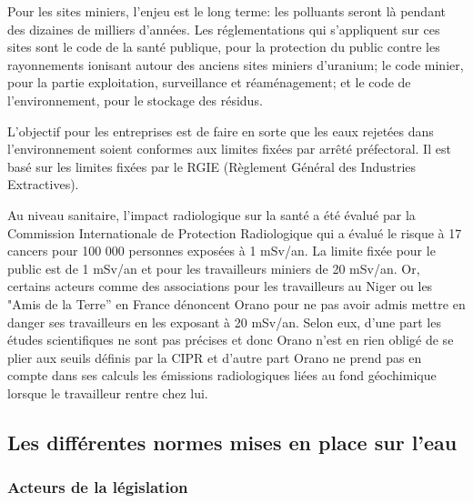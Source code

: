 \documentclass{article}
\begin{document}
Pour les sites miniers, l’enjeu est le long terme: les polluants seront là pendant des dizaines de milliers d’années. Les réglementations qui s’appliquent sur ces sites sont le code de la santé publique, pour la protection du public contre les rayonnements ionisant autour des anciens sites miniers d’uranium; le code minier, pour la partie exploitation, surveillance et réaménagement; et le code de l’environnement, pour le stockage des résidus.

L’objectif pour les entreprises est de faire en sorte que les eaux rejetées dans l’environnement   soient conformes aux limites fixées par arrêté préfectoral. Il est  basé sur les limites fixées par le RGIE (Règlement Général des Industries Extractives).

Au niveau sanitaire, l’impact radiologique sur la santé a été évalué par la Commission Internationale de Protection Radiologique qui a évalué le risque à 17 cancers pour 100 000 personnes exposées à 1 mSv/an. La limite fixée pour le public est de 1 mSv/an et pour les travailleurs miniers de 20 mSv/an. Or, certains acteurs comme des associations pour les travailleurs au Niger ou les "Amis de la Terre” en France dénoncent Orano pour ne pas avoir admis mettre en danger ses travailleurs en les exposant à 20 mSv/an. Selon eux, d’une part les études scientifiques ne sont pas précises et donc Orano n’est en rien obligé de se plier aux seuils définis par la CIPR et d’autre part Orano ne prend pas en compte dans ses calculs les émissions radiologiques liées au fond géochimique lorsque le travailleur rentre chez lui.

\subsection{Les différentes normes mises en place sur l’eau}
\subsubsection{Acteurs de la législation}
\end{document}
